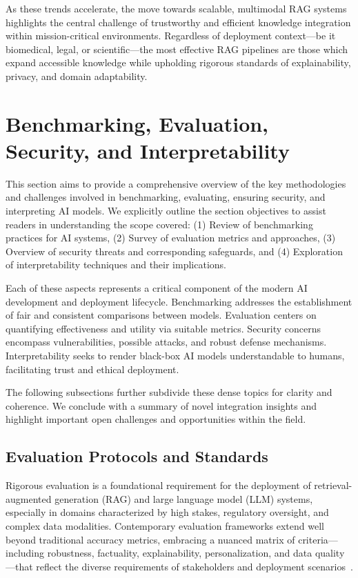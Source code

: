 \documentclass[sigconf]{acmart}
\begin{document}
As these trends accelerate, the move towards scalable, multimodal RAG systems highlights the central challenge of trustworthy and efficient knowledge integration within mission-critical environments. Regardless of deployment context—be it biomedical, legal, or scientific—the most effective RAG pipelines are those which expand accessible knowledge while upholding rigorous standards of explainability, privacy, and domain adaptability.

\section{Benchmarking, Evaluation, Security, and Interpretability}

This section aims to provide a comprehensive overview of the key methodologies and challenges involved in benchmarking, evaluating, ensuring security, and interpreting AI models. We explicitly outline the section objectives to assist readers in understanding the scope covered: (1) Review of benchmarking practices for AI systems, (2) Survey of evaluation metrics and approaches, (3) Overview of security threats and corresponding safeguards, and (4) Exploration of interpretability techniques and their implications.

Each of these aspects represents a critical component of the modern AI development and deployment lifecycle. Benchmarking addresses the establishment of fair and consistent comparisons between models. Evaluation centers on quantifying effectiveness and utility via suitable metrics. Security concerns encompass vulnerabilities, possible attacks, and robust defense mechanisms. Interpretability seeks to render black-box AI models understandable to humans, facilitating trust and ethical deployment.

The following subsections further subdivide these dense topics for clarity and coherence. We conclude with a summary of novel integration insights and highlight important open challenges and opportunities within the field.

\subsection{Evaluation Protocols and Standards}

Rigorous evaluation is a foundational requirement for the deployment of retrieval-augmented generation (RAG) and large language model (LLM) systems, especially in domains characterized by high stakes, regulatory oversight, and complex data modalities. Contemporary evaluation frameworks extend well beyond traditional accuracy metrics, embracing a nuanced matrix of criteria—including robustness, factuality, explainability, personalization, and data quality—that reflect the diverse requirements of stakeholders and deployment scenarios~\cite{ref2,ref3,ref5,ref8,ref10,ref21,ref22,ref25,ref26,ref28,ref29,ref30,ref32,ref33,ref34,ref36,ref37,ref38,ref39,ref40,ref42,ref43,ref46,ref47,ref49,ref50,ref51,ref52,ref53,ref54,ref55,ref61,ref62}.
\end{document}
